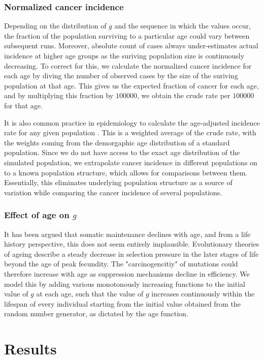 \documentclass[12pt, onecolumn]{article}
\begin{document}
	\subsubsection{Normalized cancer incidence}\label{CRR}
	Depending on the distribution of $g$ and the sequence in which the values occur, the fraction of the population surviving to a particular age could vary between subsequent runs. Moreover, absolute count of cases always under-estimates actual incidence at higher age groups as the suriving population size is continuously decreasing. To correct for this, we calculate the normalized cancer incidence for each age by diving the number of observed cases by the size of the suriving population at that age. This gives us the expected fraction of cancer for each age, and by multiplying this fraction by $100000$, we obtain the crude rate per $100000$ for that age.
	
	It is also common practice in epidemiology to calculate the age-adjusted incidence rate for any given population \cite{AmericanCancerSociety2016}. This is a weighted average of the crude rate, with the weights coming from the demorgaphic age distribution of a standard population. Since we do not have access to the exact age distribution of the simulated population, we extrapolate cancer incidence in different populations on to a known population structure, which allows for comparisons between them. Essentially, this eliminates underlying population structure as a source of variation while comparing the cancer incidence of several populations.
	
	\subsubsection{Effect of age on $g$}
	It has been argued that somatic maintenance declines with age\cite{Rozhok2016}, and from a life history perspective, this does not seem entirely implausible. Evolutionary theories of ageing describe a steady decrease in selection pressure in the later stages of life beyond the age of peak fecundity. The "carcinogencitiy" of mutations could therefore increase with age as suppression mechanisms decline in efficiency. We model this by adding various monotonously increasing functions to the initial value of $g$ at each age, such that the value of $g$ increases continuously within the lifespan of every individual starting from the initial value obtained from the random number generator, as dictated by the age function.
	

	\section{Results}
	
\end{document}
